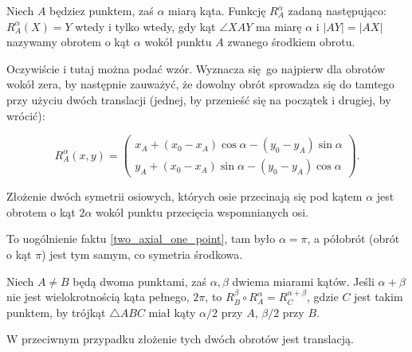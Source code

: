 
\begin{definition}[obrót]
    Niech $A$ będziez punktem, zaś $\alpha$ miarą kąta.
    Funkcję $R_A^\alpha$ zadaną następująco: $R_A^\alpha(X) = Y$ wtedy i tylko wtedy, gdy kąt $\angle XAY$ ma miarę $\alpha$ i $|AY| = |AX|$ nazywamy obrotem o kąt $\alpha$ wokół punktu $A$ zwanego środkiem obrotu.
\end{definition}

Oczywiście i tutaj można podać wzór.
Wyznacza się go najpierw dla obrotów wokół zera, by następnie zauważyć, że dowolny obrót sprowadza się do tamtego przy użyciu dwóch translacji (jednej, by przenieść się na początek i drugiej, by wrócić):

\begin{equation}
    R_A^\alpha(x,y) = \begin{pmatrix}
        x_A + (x_0 - x_A) \cos \alpha - (y_0 - y_A) \sin \alpha\\
        y_A + (x_0 - x_A) \sin \alpha - (y_0 - y_A) \cos \alpha
    \end{pmatrix}.
\end{equation}

\begin{proposition}
    Złożenie dwóch symetrii osiowych, których osie przecinają się pod kątem $\alpha$ jest obrotem o kąt $2 \alpha$ wokół punktu przecięcia wspomnianych osi.
\end{proposition}

To uogólnienie faktu \ref{two_axial_one_point}, tam było $\alpha = \pi$, a półobrót (obrót o kąt $\pi$) jest tym samym, co symetria środkowa.

\begin{proposition}
\label{for_banach_11}%
    Niech $A \neq B$ będą dwoma punktami, zaś $\alpha, \beta$ dwiema miarami kątów.
    Jeśli $\alpha + \beta$ nie jest wielokrotnością kąta pełnego, $2 \pi$, to $R_B^\beta \circ R_A^\alpha = R_C^{\alpha + \beta}$, gdzie $C$ jest takim punktem, by trójkąt $\triangle ABC$ miał kąty $\alpha/2$ przy $A$, $\beta / 2$ przy $B$.

    W przeciwnym przypadku złożenie tych dwóch obrotów jest translacją.
\end{proposition}